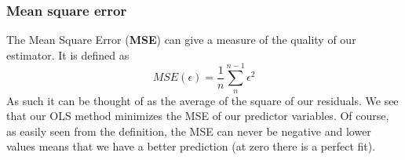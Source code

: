 \subsubsection{Mean square error}
The Mean Square Error (\textbf{MSE}) can give a measure of the quality of our estimator. It is defined as
\begin{equation}\label{eq: mse}
	MSE(\epsilon) = \frac{1}{n}\sum_n^{n-1}\epsilon^2
\end{equation}
As such it can be thought of  as the average of the square of our residuals. We see that our OLS method minimizes the MSE of our predictor variables. Of course, as easily seen from the definition, the MSE can never be negative and lower values means that we have a better prediction (at zero there is a perfect fit).


